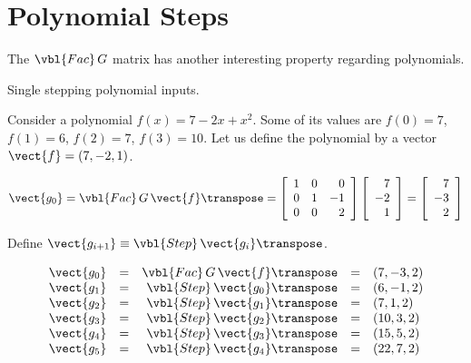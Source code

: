 \section{Polynomial Steps}

The $\vbl{Fac}\,G$ matrix has another interesting property regarding polynomials.

\begin{example}
 \label{ex:firstpoly}
 Single stepping polynomial inputs.
\end{example}

Consider a polynomial $f(x) = 7 - 2x + x^2$.
Some of its values are $f(0)=7$, $f(1)=6$, $f(2)=7$, $f(3)=10$.
Let us define the polynomial by a vector $\vect{f} = (7, -2, 1)$.

\[
 \vect{g_0} =
 \vbl{Fac}\,G\,\vect{f} \transpose =
 \left[\begin{array}{rrr}
   1 & 0 &  0 \\
   0 & 1 & -1 \\
   0 & 0 &  2 \\
 \end{array}\right]
 \left[\begin{array}{r}
   7 \\ -2 \\ 1 \\
 \end{array}\right]
 =
 \left[\begin{array}{r}
   7 \\ -3 \\ 2 \\
 \end{array}\right]
\]

Define $\vect{g_{i+1}} \equiv \vbl{Step}\,\vect{g_i} \transpose$.

\[\begin{array}{rcrcl}
  \vect{g_0} & = & \vbl{Fac}\,G\,\vect{f} \transpose & = & ( 7, -3, 2) \\
  \vect{g_1} & = & \vbl{Step}\,\vect{g_0} \transpose & = & ( 6, -1, 2) \\
  \vect{g_2} & = & \vbl{Step}\,\vect{g_1} \transpose & = & ( 7,  1, 2) \\
  \vect{g_3} & = & \vbl{Step}\,\vect{g_2} \transpose & = & (10,  3, 2) \\
  \vect{g_4} & = & \vbl{Step}\,\vect{g_3} \transpose & = & (15,  5, 2) \\
  \vect{g_5} & = & \vbl{Step}\,\vect{g_4} \transpose & = & (22,  7, 2) \\
\end{array}\]

